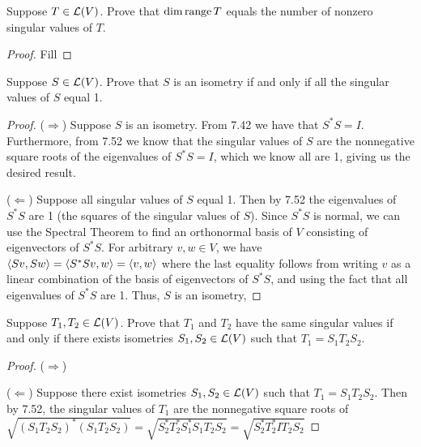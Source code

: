 \begin{exercise}{14}
  Suppose $T\in\mathcal{L}(V)$. Prove that $\dim\operatorname*{range} T$ equals the number of nonzero singular values of $T$.
\end{exercise}
\begin{proof}
 Fill
\end{proof}

\begin{exercise}{15}
  Suppose $S\in\mathcal{L}(V)$. Prove that $S$ is an isometry if and only if all  the singular values of $S$ equal 1.
\end{exercise}
\begin{proof}
 ($\Rightarrow$) Suppose $S$ is an isometry. From 7.42 we have that $S^\ast S =I$. Furthermore, from 7.52 we know that the singular values of $S$ are the nonnegative square roots of the eigenvalues of $S^\ast S =I$, which we know all are 1, giving us the desired result.

 ($\Leftarrow$) Suppose all singular values of $S$ equal 1. Then by 7.52 the eigenvalues of $S^\ast S$ are 1 (the squares of the singular values of $S$). Since $S^\ast S$ is normal, we can use the Spectral Theorem to find an orthonormal basis of $V$ consisting of eigenvectors of $S^\ast S$. For arbitrary $v,w\in V$, we have $\langle Sv,Sw\rangle =\langle S^\ast Sv,w\rangle =\langle v,w\rangle$ where the last equality follows from writing $v$ as a linear combination of the basis of eigenvectors of $S^\ast S$, and using the fact that all eigenvalues of $S^\ast S$ are 1. Thus, $S$ is an isometry,
\end{proof}

\begin{exercise}{16}
  Suppose $T_1,T_2\in\mathcal{L}(V)$. Prove that $T_1$ and $T_2$ have the same singular values if and only if there exists isometries $S_1,S_2\in\mathcal{L}(V)$ such that $T_1 =S_1T_2S_2$.
\end{exercise}
\begin{proof}
 ($\Rightarrow$)

 ($\Leftarrow$) Suppose there exist isometries $S_1,S_2\in\mathcal{L}(V)$ such that $T_1 =S_1T_2S_2$. Then by 7.52, the singular values of $T_1$ are the nonnegative square roots of $\sqrt{(S_1T_2S_2)^\ast(S_1T_2S_2)} =\sqrt{S_2^\ast T_2^\ast S_1^\ast S_1T_2S_2} =\sqrt{S_2^\ast T_2^\ast IT_2S_2}$
\end{proof}

